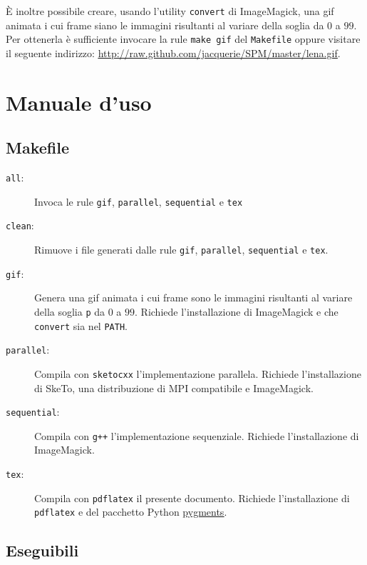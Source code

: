 \documentclass[12pt]{article}
\begin{document}
    È inoltre possibile creare, usando l'utility \texttt{convert} di
    ImageMagick, una gif animata i cui frame siano le immagini risultanti
    al variare della soglia da \(0\) a \(99\). Per ottenerla \`e sufficiente
    invocare la rule \texttt{make gif} del \texttt{Makefile} oppure visitare il
    seguente indirizzo: \href{http://raw.github.com/jacquerie/SPM/master/lena.gif}{\underline{http://raw.github.com/jacquerie/SPM/master/lena.gif}}.

  \appendix
    \section{Manuale d'uso}
      \subsection{Makefile}

      \begin{description}
        \item[\texttt{all}:] Invoca le rule \texttt{gif}, \texttt{parallel}, \texttt{sequential} e \texttt{tex}
        \item[\texttt{clean}:] Rimuove i file generati dalle rule \texttt{gif}, \texttt{parallel}, \texttt{sequential} e \texttt{tex}.
        \item[\texttt{gif}:] Genera una gif animata i cui frame sono le
          immagini risultanti al variare della soglia \texttt{p} da \(0\) a
          \(99\). Richiede l'installazione di ImageMagick e che \texttt{convert}
          sia nel \texttt{PATH}.
        \item[\texttt{parallel}:] Compila con \texttt{sketocxx}
          l'implementazione parallela. Richiede l'installazione di SkeTo, una
          distribuzione di MPI compatibile e ImageMagick.
        \item[\texttt{sequential}:] Compila con \texttt{g++} l'implementazione
          sequenziale. Richiede l'installazione di ImageMagick.
        \item[\texttt{tex}:] Compila con \texttt{pdflatex} il presente
          documento. Richiede l'installazione di \texttt{pdflatex} e del
          pacchetto Python \href{http://pygments.org}{\underline{pygments}}.
      \end{description}

      \subsection{Eseguibili}
\end{document}
